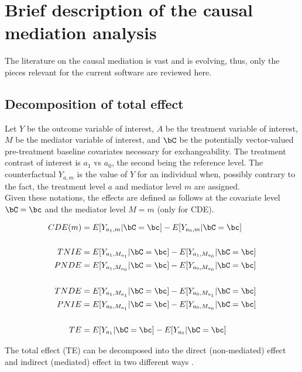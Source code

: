 \documentclass[dvipdfmx,10pt]{article}
\date{\today}
\title{}
\begin{document}
\tableofcontents

\sloppy
\newpage
\section{Brief description of the causal mediation analysis}
\label{sec:org9996e98}

The literature on the causal mediation is vast \cite{vanderweeleExplanationCausalInference2015} and is evolving, thus, only the pieces relevant for the current software are reviewed here.

\subsection{Decomposition of total effect}
\label{sec:org8496110}
Let \(Y\) be the outcome variable of interest, \(A\) be the treatment variable of interest, \(M\) be the mediator variable of interest, and \(\bC\) be the potentially vector-valued pre-treatment baseline covariates necessary for exchangeability. The treatment contrast of interest is \(a_{1}\) vs \(a_{0}\), the second being the reference level. The counterfactual \(Y_{a,m}\) is the value of \(Y\) for an individual when, possibly contrary to the fact, the treatment level \(a\) and mediator level \(m\) are assigned.\\

Given these notations, the effects are defined as follows at the covariate level \(\bC = \bc\) and the mediator level \(M = m\) (only for CDE).

\begin{align*}
  CDE(m) &= E[Y_{a_{1},m} | \bC = \bc] - E[Y_{a_{0},m} | \bC = \bc]\\
  \\
  TNIE &= E[Y_{a_{1},M_{a_{1}}} | \bC = \bc] - E[Y_{a_{1},M_{a_{0}}} | \bC = \bc]\\
  PNDE &= E[Y_{a_{1},M_{a_{0}}} | \bC = \bc] - E[Y_{a_{0},M_{a_{0}}} | \bC = \bc]\\
  \\
  TNDE &= E[Y_{a_{1},M_{a_{1}}} | \bC = \bc] - E[Y_{a_{0},M_{a_{1}}} | \bC = \bc]\\
  PNIE &= E[Y_{a_{0},M_{a_{1}}} | \bC = \bc] - E[Y_{a_{0},M_{a_{0}}} | \bC = \bc]\\
  \\
  TE &= E[Y_{a_{1}} | \bC = \bc] - E[Y_{a_{0}} | \bC = \bc]\\
\end{align*}

The total effect (TE) can be decomposed into the direct (non-mediated) effect and indirect (mediated) effect in two different ways \cite{robinsIdentifiabilityExchangeabilityDirect1992,vanderweeleThreewayDecompositionTotal2013}.\\
\end{document}

